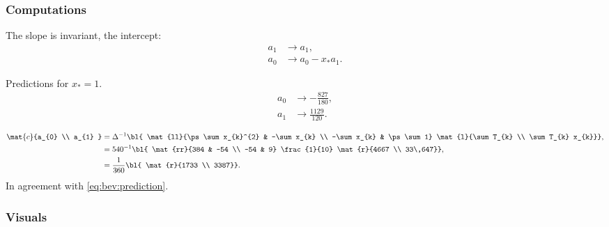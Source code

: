 \subsubsection{Computations}  %

The slope is invariant, the intercept:
  \begin{equation*}   %
    \begin{split}
      a_{1} & \rightarrow a_{1}, \\
      a_{0} & \rightarrow a_{0} - x_{*} a_{1}.
    \end{split}
  \end{equation*}

Predictions for $x_{*} = 1$. 
  \begin{equation}   %
    \begin{split}
      a_{0} & \rightarrow -\frac{827}  {180}, \\
      a_{1} & \rightarrow  \frac{1129} {120}.
    \label{eq:bev:prediction}
    \end{split}
  \end{equation}

  \begin{equation*}
    \begin{split}
      \mat{c}{a_{0} \\ a_{1} } 
        &= \Delta^{-1}
           \bl{
            \mat{ll}{\ps \sum x_{k}^{2} & -\sum x_{k} \\ -\sum x_{k} & \ps \sum 1}
            \mat{l}{\sum T_{k} \\ \sum T_{k} x_{k}}} , \\
        &= 540^{-1}
           \bl{
            \mat{rr}{384 & -54 \\ -54 & 9} \frac{1}{10}
            \mat{r}{4667 \\ 33\,647}} , \\
        &= \frac{1}{360}
           \bl{
           \mat{r}{1733 \\ 3387}}.
    \end{split}
  \end{equation*}
In agreement with \eqref{eq:bev:prediction}.

\subsubsection{Visuals}  %

